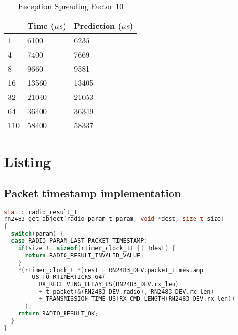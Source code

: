 \begin{table}[H]
\centering
\begin{tabular}{|l|l|l|}
\hline
\rowcolor[HTML]{C0C0C0} 
\multicolumn{1}{|c|}{\cellcolor[HTML]{C0C0C0}Bytes} & Time ($\mu s$) & Prediction ($\mu s$) \\ \hline
1                                                   & 6100      & 6235       \\ \hline
4                                                   & 7400      & 7669       \\ \hline
8                                                   & 9660      & 9581       \\ \hline
16                                                  & 13560     & 13405      \\ \hline
32                                                  & 21040     & 21053      \\ \hline
64                                                  & 36400     & 36349      \\ \hline
110                                                 & 58400     & 58337      \\ \hline
\end{tabular}
\caption{Reception Spreading Factor 10\label{table:rxsf10}}
\end{table}

\chapter{Listing}

\section{Packet timestamp implementation\label{code:timestampimpl}}

\begin{lstlisting}[language=c]
static radio_result_t
rn2483_get_object(radio_param_t param, void *dest, size_t size)
{
  switch(param) {
  case RADIO_PARAM_LAST_PACKET_TIMESTAMP:
    if(size != sizeof(rtimer_clock_t) || !dest) {
      return RADIO_RESULT_INVALID_VALUE;
    }
    *(rtimer_clock_t *)dest = RN2483_DEV.packet_timestamp 
      - US_TO_RTIMERTICKS_64(
          RX_RECEIVING_DELAY_US(RN2483_DEV.rx_len)
          + t_packet(&(RN2483_DEV.radio), RN2483_DEV.rx_len)
          + TRANSMISSION_TIME_US(RX_CMD_LENGTH(RN2483_DEV.rx_len))
      );
    return RADIO_RESULT_OK;
  }
}
\end{lstlisting}



